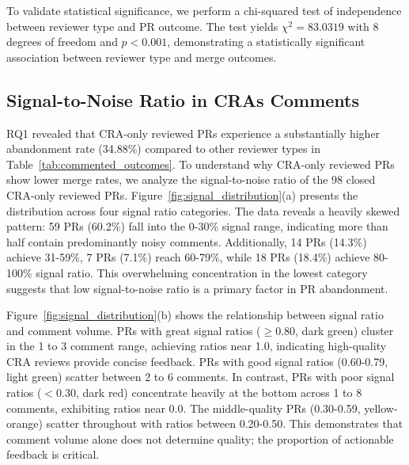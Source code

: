 \documentclass[sigconf]{acmart}
\begin{document}
To validate statistical significance, we perform a chi-squared test of independence between reviewer type and PR outcome. The test yields $\chi^2 = 83.0319$ with 8 degrees of freedom and  $p < 0.001$, demonstrating a statistically significant association between reviewer type and merge outcomes.

\noindent 
{}

\subsection{Signal-to-Noise Ratio in CRAs Comments}

RQ1 revealed that CRA-only reviewed PRs experience a substantially higher abandonment rate (34.88\%) compared to other reviewer types in Table~\ref{tab:commented_outcomes}. To understand why CRA-only reviewed PRs show lower merge rates, we analyze the signal-to-noise ratio of the 98 closed CRA-only reviewed PRs. Figure~\ref{fig:signal_distribution}(a) presents the distribution across four signal ratio categories. The data reveals a heavily skewed pattern: 59 PRs (60.2\%) fall into the 0-30\% signal range, indicating more than half contain predominantly noisy comments. Additionally, 14 PRs (14.3\%) achieve 31-59\%, 7 PRs (7.1\%) reach 60-79\%, while 18 PRs (18.4\%) achieve 80-100\% signal ratio. This overwhelming concentration in the lowest category suggests that low signal-to-noise ratio is a primary factor in PR abandonment.

Figure~\ref{fig:signal_distribution}(b) shows the relationship between signal ratio and comment volume. PRs with great signal ratios ($\geq$0.80, dark green) cluster in the 1 to 3 comment range, achieving ratios near 1.0, indicating high-quality CRA reviews provide concise feedback. PRs with good signal ratios (0.60-0.79, light green) scatter between 2 to 6 comments. In contrast, PRs with poor signal ratios ($<$0.30, dark red) concentrate heavily at the bottom across 1 to 8 comments, exhibiting ratios near 0.0. The middle-quality PRs (0.30-0.59, yellow-orange) scatter throughout with ratios between 0.20-0.50. This demonstrates that comment volume alone does not determine quality; the proportion of actionable feedback is critical.
\end{document}
